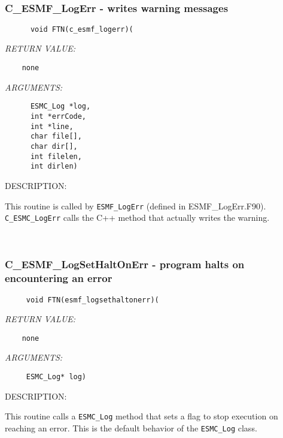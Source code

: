  
\mbox{}\hrulefill\ 
 
\subsubsection [C\_ESMF\_LogErr] {C\_ESMF\_LogErr - writes warning messages}


  
\begin{verbatim}      void FTN(c_esmf_logerr)(\end{verbatim}{\em RETURN VALUE:}
\begin{verbatim}    none\end{verbatim}{\em ARGUMENTS:}
\begin{verbatim}      ESMC_Log *log,
      int *errCode,
      int *line, 
      char file[],
      char dir[],
      int filelen,
      int dirlen)\end{verbatim}
{\sf DESCRIPTION:\\ }


      This routine is called by {\tt ESMF\_LogErr} (defined in ESMF\_LogErr.F90). 
      {\tt C\_ESMC\_LogErr} calls the C++ method that actually writes the warning.
   
 
\mbox{}\hrulefill\ 
 

  \subsubsection [C\_ESMF\_LogSetHaltOnErr] {C\_ESMF\_LogSetHaltOnErr - program halts on encountering an error}


  
\begin{verbatim}     void FTN(esmf_logsethaltonerr)(\end{verbatim}{\em RETURN VALUE:}
\begin{verbatim}    none\end{verbatim}{\em ARGUMENTS:}
\begin{verbatim}     ESMC_Log* log)\end{verbatim}
{\sf DESCRIPTION:\\ }


      This routine calls a {\tt ESMC\_Log} method that sets
      a flag to stop execution on
      reaching an error. This is the default behavior of the {\tt ESMC\_Log} class. 
 
